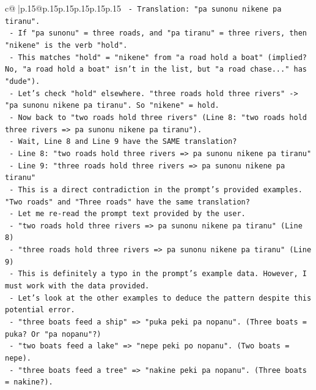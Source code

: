 \documentclass{article}
\begin{document}
{\begin{supertabular}{c@{$\;$}|p{.15\linewidth}@{}p{.15\linewidth}p{.15\linewidth}p{.15\linewidth}p{.15\linewidth}p{.15\linewidth}}
{{{\texttt{                 {-} Translation: "pa sunonu nikene pa tiranu".} \\
\texttt{                 {-} If "pa sunonu" = three roads, and "pa tiranu" = three rivers, then "nikene" is the verb "hold".} \\
\texttt{                 {-} This matches "hold" = "nikene" from "a road hold a boat" (implied? No, "a road hold a boat" isn't in the list, but "a road chase..." has "dude").} \\
\texttt{                 {-} Let's check "hold" elsewhere. "three roads hold three rivers" {-}> "pa sunonu nikene pa tiranu". So "nikene" = hold.} \\
\texttt{                 {-} Now back to "two roads hold three rivers" (Line 8: "two roads hold three rivers => pa sunonu nikene pa tiranu").} \\
\texttt{                 {-} Wait, Line 8 and Line 9 have the SAME translation?} \\
\texttt{                   {-} Line 8: "two roads hold three rivers => pa sunonu nikene pa tiranu"} \\
\texttt{                   {-} Line 9: "three roads hold three rivers => pa sunonu nikene pa tiranu"} \\
\texttt{                 {-} This is a direct contradiction in the prompt's provided examples. "Two roads" and "Three roads" have the same translation?} \\
\texttt{                 {-} Let me re{-}read the prompt text provided by the user.} \\
\texttt{                   {-} "two roads hold three rivers => pa sunonu nikene pa tiranu" (Line 8)} \\
\texttt{                   {-} "three roads hold three rivers => pa sunonu nikene pa tiranu" (Line 9)} \\
\texttt{                 {-} This is definitely a typo in the prompt's example data. However, I must work with the data provided.} \\
\texttt{                 {-} Let's look at the other examples to deduce the pattern despite this potential error.} \\
\texttt{                   {-} "three boats feed a ship" => "puka peki pa nopanu". (Three boats = puka? Or "pa nopanu"?)} \\
\texttt{                   {-} "two boats feed a lake" => "nepe peki po nopanu". (Two boats = nepe).} \\
\texttt{                   {-} "three boats feed a tree" => "nakine peki pa nopanu". (Three boats = nakine?).} \\
}}}
\end{supertabular}}
\end{document}

